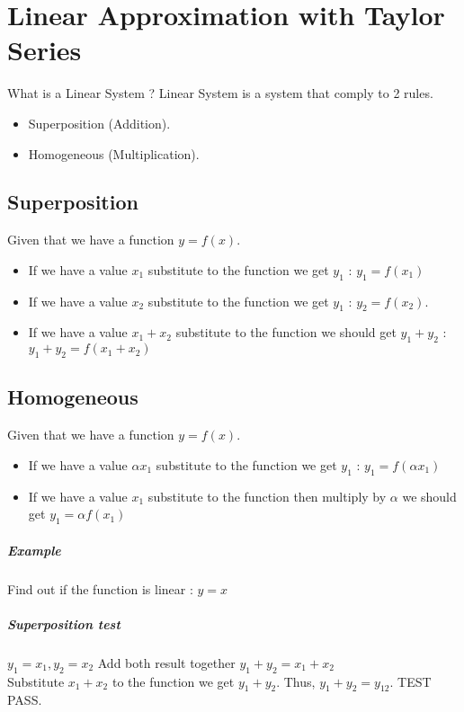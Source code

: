 \chapter{Linear Approximation with Taylor Series}
What is a Linear System ?
Linear System is a system that comply to 2 rules.
\begin{itemize}
	\item Superposition (Addition).
	\item Homogeneous (Multiplication). 
\end{itemize}

\section{Superposition}


Given that we have a function \(y = f(x)\).
\begin{itemize}
	\item If we have a value \(x_1\) substitute to the function we get \(y_1\) : \(y_1 = f(x_1)\)
	\item If we have a value \(x_2\) substitute to the function we get \(y_1\) : \(y_2 = f(x_2)\).
	\item If we have a value \(x_1 + x_2\) substitute to the function we should get \(y_1+y_2\) : \(y_1+y_2 = f(x_1+x_2)\)
\end{itemize}

\section{Homogeneous}

Given that we have a function \(y = f(x)\).
\begin{itemize}
	\item If we have a value \(\alpha x_1\) substitute to the function we get \(y_1\) : \(y_1 = f(\alpha x_1)\)
	\item If we have a value \(x_1\) substitute to the function then multiply by \(\alpha\) we should get \(y_1 = \alpha f(x_1)\)
\end{itemize}

\paragraph{Example} Find out if the function is linear : \(y = x\)
\paragraph{Superposition test} \(y_1 = x_1, y_2 = x_2\)
Add both result together \(y_1 + y_2 = x_1 + x_2\) \\
Substitute \(x_1 + x_2\) to the function we get \(y_1+y_2\). Thus, \(y_1+y_2=y_{12}\). TEST PASS.

